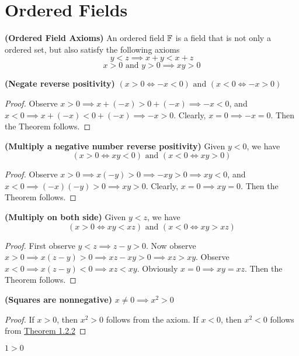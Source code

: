 \documentclass{report}
\begin{document}
\section{Ordered Fields}
\begin{axiom}
\textbf{(Ordered Field Axioms)} An ordered field $\mathbb{F}$ is a field that is not only a ordered set, but also satisfy the following axioms
\begin{equation}
y<z\implies x+y<x+z
\end{equation}
\begin{equation}
x>0\text{ and }y>0\implies xy>0
\end{equation}
\end{axiom}
\begin{theorem}
  \label{1.2.2}
\textbf{(Negate reverse positivity)} $(x>0\iff -x<0)\text{ and }(x<0\iff -x>0)$
\end{theorem}
\begin{proof}
  Observe $x>0\implies x+(-x)>0+(-x)\implies -x<0$, and $x<0\implies x+(-x)<0+(-x)\implies -x>0$. Clearly, $x=0\implies -x=0$. Then the Theorem follows.
\end{proof}
\begin{theorem}
    \label{1.2.3}
  
\textbf{(Multiply a negative number reverse positivity)} Given $y<0$, we have
\begin{equation}
  (x>0\iff xy<0)\text{ and }(x<0\iff xy>0)
\end{equation}
\end{theorem}
\begin{proof}
Observe $x>0\implies x(-y)>0\implies -xy>0\implies xy<0$, and 
$x<0\implies (-x)(-y)>0\implies xy>0$. Clearly, $x=0\implies xy=0$. Then the Theorem follows. 
\end{proof}
\begin{theorem}
\textbf{(Multiply on both side)}  Given $y<z$, we have
\begin{equation}
  (x>0\iff xy<xz)\text{ and }(x<0\iff xy>xz)
\end{equation}
\end{theorem}
\begin{proof}
First observe $y<z\implies z-y>0$. Now observe $x>0\implies x(z-y)>0\implies xz-xy>0\implies xz>xy$. 
Observe  $x<0\implies x(z-y)<0\implies xz<xy$. Obviously $x=0\implies  xy=xz$. Then the Theorem follows.
\end{proof}
\begin{theorem}
  \textbf{(Squares are nonnegative)} $x\neq 0\implies x^2>0$
\end{theorem}
\begin{proof}
  If $x>0$, then $x^2>0$ follows from the axiom. If $x<0$, then $x^2<0$ follows from \hyperref[1.2.2]{Theorem 1.2.2}
\end{proof}
\begin{corollary}
$1>0$
\end{corollary}
\end{document}
